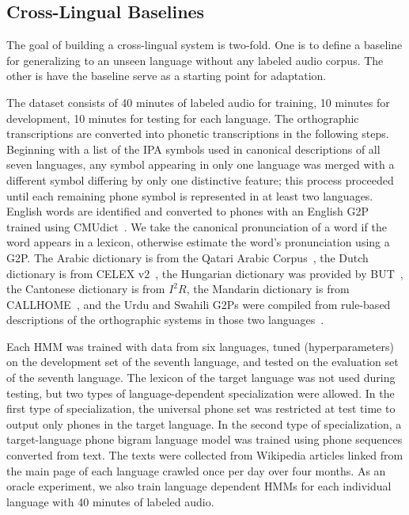 \subsection{Cross-Lingual Baselines}
\label{sec:mlbaseline}

The goal of building a cross-lingual system is two-fold.
One is to define a baseline for generalizing to an unseen
language without any labeled audio corpus.  The other
is have the baseline serve as a starting point for
adaptation.

The dataset consists of 40 minutes of labeled audio for training,
10 minutes for development, 10 minutes for testing
for each language.
The orthographic transcriptions are converted into
phonetic transcriptions in the following steps.
Beginning with a list of the IPA symbols used in canonical descriptions
of all seven languages,
any symbol appearing in only one language was merged with a different symbol
differing by only one distinctive feature; this process proceeded until 
each remaining phone symbol is represented in at least two languages.
English words are identified and converted to phones with
an English G2P trained using CMUdict~\cite{Lenzo1995}.
We take the canonical pronunciation of a word if the word
appears in a lexicon,
otherwise estimate the word's pronunciation using a G2P.
The Arabic dictionary is from the Qatari Arabic Corpus~\cite{Elmahdy14},
the Dutch dictionary is from CELEX v2~\cite{Baayen96},
the Hungarian dictionary was provided by BUT~\cite{Grezl14},
the Cantonese dictionary is from $I^2R$,
the Mandarin dictionary is from CALLHOME~\cite{Canavan96},
and the Urdu and Swahili G2Ps were compiled from
rule-based descriptions of the orthographic systems in those
two languages~\cite{Hasegawajohnson15}.

Each HMM was trained with data from six languages, tuned
(hyperparameters) on the development set of the seventh language, and
tested on the evaluation set of the seventh language.  The lexicon of
the target language was not used during testing, but two types of
language-dependent specialization were allowed.  In the first type of
specialization, the universal phone set was restricted at test time to
output only phones in the target language.  In the second type of
specialization, a target-language phone bigram language model was
trained using phone sequences converted from text.  The texts were
collected from Wikipedia articles linked from the main page of each
language crawled once per day over four months.
As an oracle experiment, we also train language dependent
HMMs for each individual language with 40 minutes of labeled audio.

